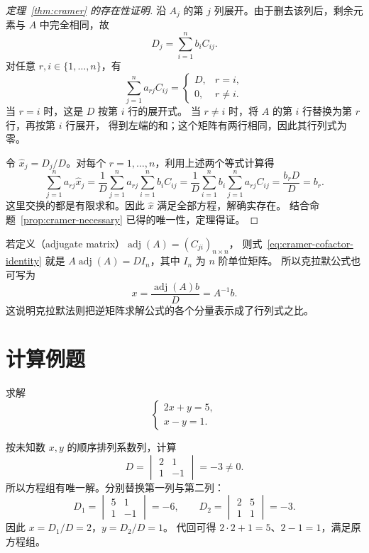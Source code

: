 \documentclass[UTF8,12pt,a4paper,fontset=fandol]{ctexart}
\begin{document}
\begin{proof}[定理~\ref{thm:cramer} 的存在性证明]
沿 $A_j$ 的第 $j$ 列展开。由于删去该列后，剩余元素与 $A$ 中完全相同，故
\begin{equation}
  D_j=\sum_{i=1}^n b_iC_{ij}.
  \label{eq:cramer-cofactor-expansion}
\end{equation}
对任意 $r,i\in\{1,\ldots,n\}$，有
\begin{equation}
  \sum_{j=1}^n a_{rj}C_{ij}
  =\begin{cases}
    D,&r=i,\\
    0,&r\ne i.
  \end{cases}
  \label{eq:cramer-cofactor-identity}
\end{equation}
当 $r=i$ 时，这是 $D$ 按第 $i$ 行的展开式。
当 $r\ne i$ 时，将 $A$ 的第 $i$ 行替换为第 $r$ 行，再按第 $i$ 行展开，
得到左端的和；这个矩阵有两行相同，因此其行列式为零。

令 $\widehat x_j=D_j/D$。对每个 $r=1,\ldots,n$，利用上述两个等式计算得
\[
  \sum_{j=1}^n a_{rj}\widehat x_j
  =\frac1D\sum_{j=1}^n a_{rj}\sum_{i=1}^n b_iC_{ij}
  =\frac1D\sum_{i=1}^n b_i\sum_{j=1}^n a_{rj}C_{ij}
  =\frac{b_rD}{D}=b_r.
\]
这里交换的都是有限求和。因此 $\widehat x$ 满足全部方程，解确实存在。
结合命题~\ref{prop:cramer-necessary} 已得的唯一性，定理得证。
\end{proof}

若定义（adjugate matrix）$\operatorname{adj}(A)=(C_{ji})_{n\times n}$，
则式~\eqref{eq:cramer-cofactor-identity} 就是
$A\operatorname{adj}(A)=DI_n$，其中 $I_n$ 为 $n$ 阶单位矩阵。
所以克拉默公式也可写为
\[
  x=\frac{\operatorname{adj}(A)b}{D}=A^{-1}b.
\]
这说明克拉默法则把逆矩阵求解公式的各个分量表示成了行列式之比。

\section{计算例题}

\begin{example}[二元方程组]
求解
\[
  \begin{cases}2x+y=5,\\x-y=1.\end{cases}
\]
\end{example}

\begin{solve}
按未知数 $x,y$ 的顺序排列系数列，计算
\[
  D=\begin{vmatrix}2&1\\1&-1\end{vmatrix}=-3\ne0.
\]
所以方程组有唯一解。分别替换第一列与第二列：
\[
  D_1=\begin{vmatrix}5&1\\1&-1\end{vmatrix}=-6,\qquad
  D_2=\begin{vmatrix}2&5\\1&1\end{vmatrix}=-3.
\]
因此 $x=D_1/D=2$，$y=D_2/D=1$。
代回可得 $2\cdot2+1=5$、$2-1=1$，满足原方程组。
\end{solve}
\end{document}

